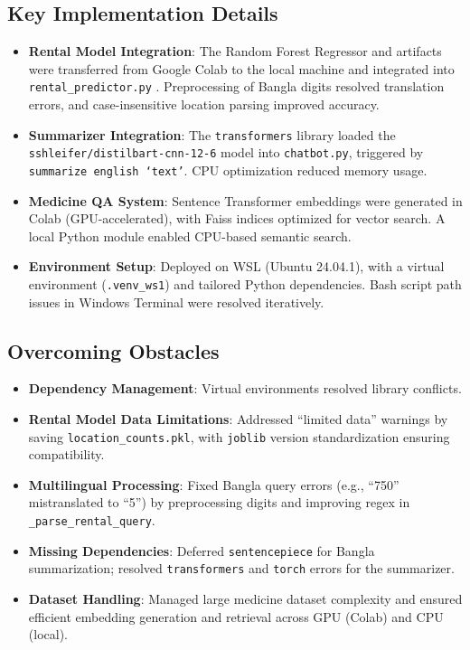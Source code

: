 \documentclass[a4paper,10pt,conference]{IEEEtran}
\begin{document}
\subsection{Key Implementation Details}
\begin{itemize}
    \item \textbf{Rental Model Integration}: The Random Forest Regressor and artifacts were transferred from Google Colab to the local machine and integrated into \texttt{rental\_predictor.py} \cite{b1}. Preprocessing of Bangla digits resolved translation errors, and case-insensitive location parsing improved accuracy.
    \item \textbf{Summarizer Integration}: The \texttt{transformers} library loaded the \texttt{sshleifer/distilbart-cnn-12-6} model into \texttt{chatbot.py}, triggered by \texttt{summarize english `text'}. CPU optimization reduced memory usage.
    \item \textbf{Medicine QA System}: Sentence Transformer embeddings were generated in Colab (GPU-accelerated), with Faiss indices optimized for vector search. A local Python module enabled CPU-based semantic search.
    \item \textbf{Environment Setup}: Deployed on WSL (Ubuntu 24.04.1), with a virtual environment (\texttt{.venv\_ws1}) and tailored Python dependencies. Bash script path issues in Windows Terminal were resolved iteratively.
\end{itemize}

\subsection{Overcoming Obstacles}
\begin{itemize}
    \item \textbf{Dependency Management}: Virtual environments resolved library conflicts.
    \item \textbf{Rental Model Data Limitations}: Addressed ``limited data'' warnings by saving \texttt{location\_counts.pkl}, with \texttt{joblib} version standardization ensuring compatibility.
    \item \textbf{Multilingual Processing}: Fixed Bangla query errors (e.g., ``750'' mistranslated to ``5'') by preprocessing digits and improving regex in \texttt{\_parse\_rental\_query}.
    \item \textbf{Missing Dependencies}: Deferred \texttt{sentencepiece} for Bangla summarization; resolved \texttt{transformers} and \texttt{torch} errors for the summarizer.
    \item \textbf{Dataset Handling}: Managed large medicine dataset complexity and ensured efficient embedding generation and retrieval across GPU (Colab) and CPU (local).
\end{itemize}
\end{document}
